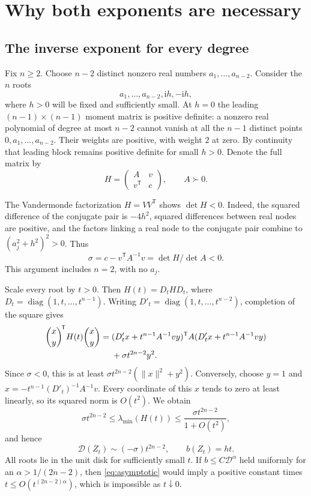 \documentclass[11pt]{article}
\theoremstyle{definition}
\newcommand{\I}{\mathrm i}
\newcommand{\defect}{\mathcal D}
\begin{document}
\section{Why both exponents are necessary}
\label{sec:sharpness}

\subsection{The inverse exponent for every degree}

Fix $n\geq2$. Choose $n-2$ distinct nonzero real numbers
$a_1,\ldots,a_{n-2}$. Consider the $n$ roots
\[
 a_1,\ldots,a_{n-2},\I h,-\I h,
\]
where $h>0$ will be fixed and sufficiently small. At $h=0$ the leading
$(n-1)\times(n-1)$ moment matrix is positive definite: a nonzero real
polynomial of degree at most $n-2$ cannot vanish at all the $n-1$ distinct
points $0,a_1,\ldots,a_{n-2}$. Their weights are positive, with weight $2$
at zero. By continuity that leading block remains positive definite for
small $h>0$. Denote the full matrix by
\[
 H=\begin{pmatrix}A&v\\v^{\mathsf T}&c\end{pmatrix},\qquad A\succ0.
\]

The Vandermonde factorization $H=VV^{\mathsf T}$ shows
$\det H<0$. Indeed, the squared difference of the conjugate pair is
$-4h^2$, squared differences between real nodes are positive, and the
factors linking a real node to the conjugate pair combine to
$(a_j^2+h^2)^2>0$. Thus
\begin{equation}
 \sigma=c-v^{\mathsf T}A^{-1}v=\det H/\det A<0.
 \label{eq:schur}
\end{equation}
This argument includes $n=2$, with no $a_j$.

Scale every root by $t>0$. Then
$H(t)=D_tHD_t$, where $D_t=\operatorname{diag}(1,t,\ldots,t^{n-1})$.
Writing $D'_t=\operatorname{diag}(1,t,\ldots,t^{n-2})$, completion of the
square gives
\begin{align}
 \binom{x}{y}^{\!\mathsf T}H(t)\binom{x}{y}
 ={}&(D'_t x+t^{n-1}A^{-1}vy)^{\mathsf T}
 A(D'_t x+t^{n-1}A^{-1}vy)\notag\\
 &+\sigma t^{2n-2}y^2.
 \label{eq:square}
\end{align}
Since $\sigma<0$, this is at least
$\sigma t^{2n-2}(\|x\|^2+y^2)$. Conversely, choose $y=1$ and
$x=-t^{n-1}(D'_t)^{-1}A^{-1}v$. Every coordinate of this $x$ tends to
zero at least linearly, so its squared norm is $O(t^2)$. We obtain
\[
 \sigma t^{2n-2}\leq\lambda_{\min}(H(t))
 \leq\frac{\sigma t^{2n-2}}{1+O(t^2)},
\]
and hence
\begin{equation}
 \defect(Z_t)\sim(-\sigma)t^{2n-2},\qquad b(Z_t)=ht.
 \label{eq:asymptotic}
\end{equation}
All roots lie in the unit disk for sufficiently small $t$.
If $b\leq C\defect^{\alpha}$ held uniformly for an
$\alpha>1/(2n-2)$, then \eqref{eq:asymptotic} would imply a positive
constant times $t\leq O(t^{(2n-2)\alpha})$, which is impossible as
$t\downarrow0$.
\end{document}
